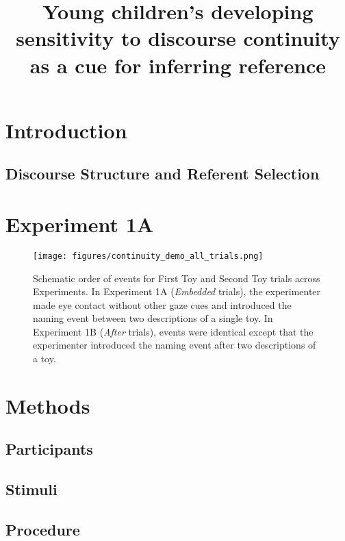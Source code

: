 \documentclass[man]{apa2}
\title{Young children's developing sensitivity to discourse continuity as a cue for inferring reference}
\begin{document}
\maketitle                            


\section{Introduction}

\subsection{Discourse Structure and Referent Selection}

\section{Experiment 1A}


\begin{figure} 
  \begin{center} 
    \texttt{[image: figures/continuity\_demo\_all\_trials.png]} 
    \caption{\label{fig:demo} Schematic order of events for First Toy and Second Toy trials across Experiments. In Experiment 1A (\emph{Embedded} trials), the experimenter made eye contact without other gaze cues and introduced the naming event between two descriptions of a single toy.  In Experiment 1B (\emph{After} trials), events were identical except that the experimenter introduced the naming event after two descriptions of a toy.} 
  \end{center} 
\end{figure}	

\section{Methods}


\subsection{Participants}

\subsection{Stimuli}



\subsection{Procedure}
\end{document}
